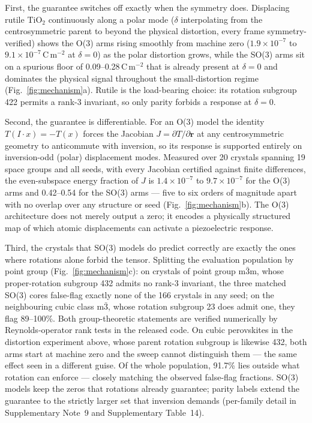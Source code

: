 First, the guarantee switches off exactly when the symmetry does. Displacing rutile TiO$_2$ continuously along a polar mode ($\delta$ interpolating from the centrosymmetric parent to beyond the physical distortion, every frame symmetry-verified) shows the O(3) arms rising smoothly from machine zero ($1.9\times10^{-7}$ to $9.1\times10^{-7}$\,C\,m$^{-2}$ at $\delta=0$) as the polar distortion grows, while the SO(3) arms sit on a spurious floor of 0.09--0.28\,C\,m$^{-2}$ that is already present at $\delta=0$ and dominates the physical signal throughout the small-distortion regime (Fig.~\ref{fig:mechanism}a). Rutile is the load-bearing choice: its rotation subgroup 422 permits a rank-3 invariant, so only parity forbids a response at $\delta=0$.

Second, the guarantee is differentiable. For an O(3) model the identity $T(I\!\cdot\!x) = -T(x)$ forces the Jacobian $J = \partial T/\partial \mathbf{r}$ at any centrosymmetric geometry to anticommute with inversion, so its response is supported entirely on inversion-odd (polar) displacement modes. Measured over 20 crystals spanning 19 space groups and all seeds, with every Jacobian certified against finite differences, the even-subspace energy fraction of $J$ is $1.4\times10^{-7}$ to $9.7\times10^{-7}$ for the O(3) arms and 0.42--0.54 for the SO(3) arms --- five to six orders of magnitude apart with no overlap over any structure or seed (Fig.~\ref{fig:mechanism}b). The O(3) architecture does not merely output a zero; it encodes a physically structured map of which atomic displacements can activate a piezoelectric response.

Third, the crystals that SO(3) models do predict correctly are exactly the ones where rotations alone forbid the tensor. Splitting the evaluation population by point group (Fig.~\ref{fig:mechanism}c): on crystals of point group m$\bar 3$m, whose proper-rotation subgroup 432 admits no rank-3 invariant, the three matched SO(3) cores false-flag exactly none of the 166 crystals in any seed; on the neighbouring cubic class m$\bar 3$, whose rotation subgroup 23 does admit one, they flag 89--100\%. Both group-theoretic statements are verified numerically by Reynolds-operator rank tests in the released code. On cubic perovskites in the distortion experiment above, whose parent rotation subgroup is likewise 432, both arms start at machine zero and the sweep cannot distinguish them --- the same effect seen in a different guise. Of the whole population, 91.7\% lies outside what rotation can enforce --- closely matching the observed false-flag fractions. SO(3) models keep the zeros that rotations already guarantee; parity labels extend the guarantee to the strictly larger set that inversion demands (per-family detail in Supplementary Note~9 and Supplementary Table~14).

